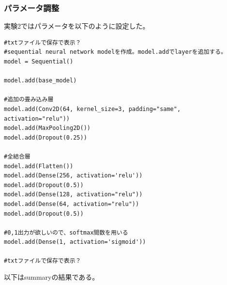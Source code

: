\documentclass[a4paper, 11pt, titlepage]{jsarticle}
\begin{document}
\subsubsection{パラメータ調整}
実験2ではパラメータを以下のように設定した。\par
\begin{lstlisting}[caption=パラメータ(実験2),label=fuga]
#txtファイルで保存で表示？
#sequential neural network modelを作成。model.addでlayerを追加する。
model = Sequential()

model.add(base_model)

#追加の畳み込み層
model.add(Conv2D(64, kernel_size=3, padding="same", activation="relu"))
model.add(MaxPooling2D())
model.add(Dropout(0.25))

#全結合層
model.add(Flatten())
model.add(Dense(256, activation='relu'))
model.add(Dropout(0.5))
model.add(Dense(128, activation="relu")) 
model.add(Dense(64, activation="relu")) 
model.add(Dropout(0.5))

#0,1出力が欲しいので、softmax間数を用いる
model.add(Dense(1, activation='sigmoid'))

#txtファイルで保存で表示？
\end{lstlisting}\par
以下はsummaryの結果である。\par
\end{document}
